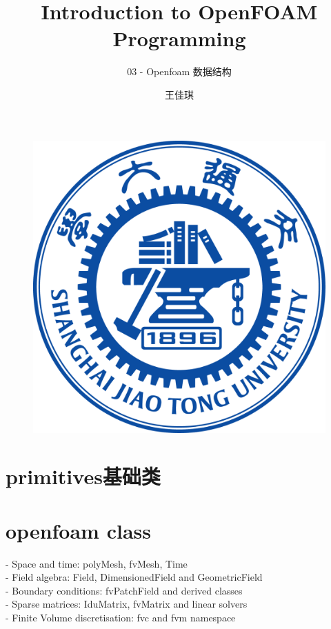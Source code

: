 \documentclass{beamer}
\author{{王佳琪}}
\title{Introduction to OpenFOAM Programming}
\subtitle{03 - Openfoam 数据结构}
\institute{\kaishu{上海交通大学}}
\date{\kaishu{2022年1月}}
\begin{document}
\songti
\begin{frame}
    \titlepage
    \begin{figure}[htpb]
        \begin{center}
            \includegraphics[width=0.15\linewidth]{pic/WUT.png}
        \end{center}
    \end{figure}
\end{frame}

\begin{frame}
    \tableofcontents[sectionstyle=show,subsectionstyle=show/shaded/hide,subsubsectionstyle=show/shaded/hide]
\end{frame}






\section{primitives基础类}














\section{openfoam class}

- Space and time: polyMesh, fvMesh, Time\\
- Field algebra: Field, DimensionedField and GeometricField\\
- Boundary conditions: fvPatchField and derived classes\\
- Sparse matrices: IduMatrix, fvMatrix and linear solvers\\
- Finite Volume discretisation: fvc and fvm namespace\\
\end{document}
